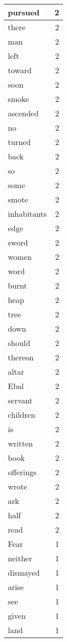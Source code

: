 \begin{center}
\begin{longtable}{l|r}
pursued & 2\\ \hline 
there & 2\\ \hline 
man & 2\\ \hline 
left & 2\\ \hline 
toward & 2\\ \hline 
soon & 2\\ \hline 
smoke & 2\\ \hline 
ascended & 2\\ \hline 
no & 2\\ \hline 
turned & 2\\ \hline 
back & 2\\ \hline 
so & 2\\ \hline 
some & 2\\ \hline 
smote & 2\\ \hline 
inhabitants & 2\\ \hline 
edge & 2\\ \hline 
sword & 2\\ \hline 
women & 2\\ \hline 
word & 2\\ \hline 
burnt & 2\\ \hline 
heap & 2\\ \hline 
tree & 2\\ \hline 
down & 2\\ \hline 
should & 2\\ \hline 
thereon & 2\\ \hline 
altar & 2\\ \hline 
Ebal & 2\\ \hline 
servant & 2\\ \hline 
children & 2\\ \hline 
is & 2\\ \hline 
written & 2\\ \hline 
book & 2\\ \hline 
offerings & 2\\ \hline 
wrote & 2\\ \hline 
ark & 2\\ \hline 
half & 2\\ \hline 
read & 2\\ \hline 
Fear & 1\\ \hline 
neither & 1\\ \hline 
dismayed & 1\\ \hline 
arise & 1\\ \hline 
see & 1\\ \hline 
given & 1\\ \hline 
land & 1\\ \hline 

\end{longtable}
\end{center}
